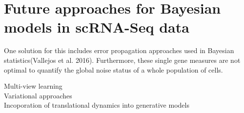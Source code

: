 \section{Future approaches for Bayesian models in scRNA-Seq data}

One solution for this includes error propagation approaches used in Bayesian statistics(Vallejos et al. 2016). Furthermore, these single gene measures are not optimal to quantify the global noise status of a whole population of cells.

Multi-view learning\\
Variational approaches\\
Incoporation of translational dynamics into generative models

